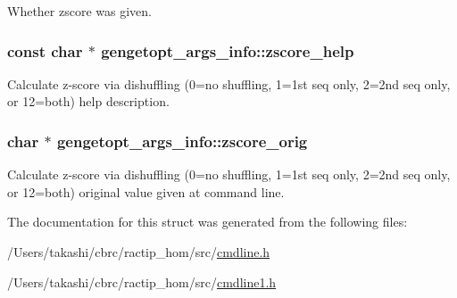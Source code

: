 Whether zscore was given. 

\hypertarget{structgengetopt__args__info_a34d3e383d7098991098429f67eeb331b}{
\subsubsection[{zscore\+\_\+help}]{\setlength{\rightskip}{0pt plus 5cm}const char $\ast$ gengetopt\+\_\+args\+\_\+info\+::zscore\+\_\+help}}\label{structgengetopt__args__info_a34d3e383d7098991098429f67eeb331b}


Calculate z-\/score via dishuffling (0=no shuffling, 1=1st seq only, 2=2nd seq only, or 12=both) help description. 

\hypertarget{structgengetopt__args__info_aab048214690b4bb2aef5468cf1f796c8}{
\subsubsection[{zscore\+\_\+orig}]{\setlength{\rightskip}{0pt plus 5cm}char $\ast$ gengetopt\+\_\+args\+\_\+info\+::zscore\+\_\+orig}}\label{structgengetopt__args__info_aab048214690b4bb2aef5468cf1f796c8}


Calculate z-\/score via dishuffling (0=no shuffling, 1=1st seq only, 2=2nd seq only, or 12=both) original value given at command line. 



The documentation for this struct was generated from the following files\+:\begin{DoxyCompactItemize}
\item 
/\+Users/takashi/cbrc/ractip\+\_\+hom/src/\hyperlink{cmdline_8h}{cmdline.\+h}\item 
/\+Users/takashi/cbrc/ractip\+\_\+hom/src/\hyperlink{cmdline1_8h}{cmdline1.\+h}\end{DoxyCompactItemize}
